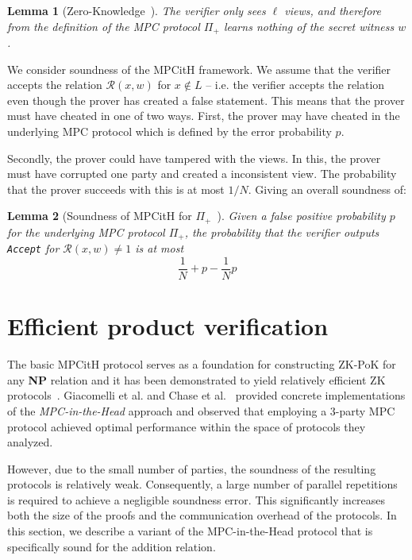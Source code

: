 \documentclass[11pt]{report}
\theoremstyle{definition}
\theoremstyle{plain}
\newtheorem{lemma}{Lemma}[section]
\begin{document}
\begin{lemma}[Zero-Knowledge~\cite{ishai2007zero}]
  The verifier only sees $\ell$ views, and therefore from the definition of the MPC protocol $\Pi_+$ learns nothing of the secret witness $w$.
\end{lemma}

We consider soundness of the MPCitH framework. We assume that the verifier accepts the relation $\mathcal{R}(x,w)$ for $x \notin L$ -- i.e. the verifier accepts the relation even though the prover has created a false statement. This means that the prover must have cheated in one of two ways. First, the prover may have cheated in the underlying MPC protocol which is defined by the error probability $p$.

Secondly, the prover could have tampered with the views. In this, the prover must have corrupted one party and created a inconsistent view. The probability that the prover succeeds with this is at most $1 / N$. Giving an overall soundness of:

\begin{lemma}[Soundness of MPCitH for $\Pi_+$~\cite{feneuil2022syndrome}]\label{lem:soundness_mpcinth} Given a false positive probability $p$ for the underlying MPC protocol $\Pi_+$, the probability that the verifier outputs \texttt{Accept} for $\mathcal{R}(x,w) \neq 1$ is at most \[ \frac{1}{N} + p - \frac{1}{N} p \]
\end{lemma}


\section{Efficient product verification}\label{sec:mpc_sacrificing}

The basic MPCitH protocol serves as a foundation for constructing ZK-PoK for any \textbf{NP} relation and it has been demonstrated to yield relatively efficient ZK protocols~\cite{feneuil2022syndrome,baum2020concretely,katz2018improved}. Giacomelli et al. and Chase et al.~\cite{katz2018improved,giacomelli2016zkboo,chase2017post} provided concrete implementations of the \textit{MPC-in-the-Head} approach and observed that employing a 3-party MPC protocol achieved optimal performance within the space of protocols they analyzed.

However, due to the small number of parties, the soundness of the resulting protocols is relatively weak. Consequently, a large number of parallel repetitions is required to achieve a negligible soundness error. This significantly increases both the size of the proofs and the communication overhead of the protocols. In this section, we describe a variant of the MPC-in-the-Head protocol that is specifically sound for the addition relation.
\end{document}
